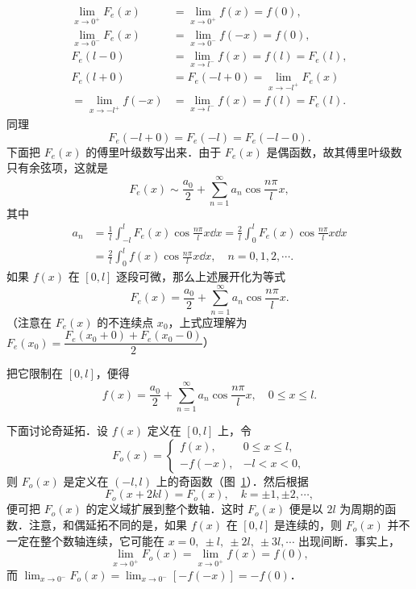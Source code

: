 \[
\begin{aligned}
\lim_{x\to 0^{+}}F_{e}(x)&=\lim_{x\to 0^{+}}f(x)=f(0),\\
\lim_{x\to 0^{-}}F_{e}(x)&=\lim_{x\to 0^{-}}f(-x)=f(0),\\
F_{e}(l-0)&=\lim_{x\to l^{-}}f(x)=f(l)=F_{e}(l),\\
F_{e}(l+0)&=F_{e}(-l+0)=\lim_{x\to -l^{+}}F_{e}(x)\\
=\lim_{x\to -l^{+}}f(-x)&=\lim_{x\to l^{-}}f(x)=f(l)=F_{e}(l).
\end{aligned}
\]
同理
\[
F_{e}(-l+0)=F_{e}(-l)=F_{e}(-l-0).
\]
下面把 $F_{e}(x)$ 的傅里叶级数写出来．由于 $F_{e}(x)$ 是偶函数，故其傅里叶级数只有余弦项，这就是
\[
F_{e}(x)\sim\frac{a_{0}}{2}+\sum_{n=1}^{\infty}a_{n}\cos\frac{n\pi}{l}x,
\]
其中
\[
\begin{aligned}
a_{n}&=\frac{1}{l}\int_{-l}^{l}F_{e}(x)\cos\frac{n\pi}{l}x\dd x=\frac{2}{l}\int_{0}^{l}F_{e}(x)\cos\frac{n\pi}{l}x\dd x\\
&=\frac{2}{l}\int_{0}^{l}f(x)\cos\frac{n\pi}{l}x\dd x,\quad n=0,1,2,\cdots.
\end{aligned}
\]
如果 $f(x)$ 在 $[0,l]$ 逐段可微，那么上述展开化为等式
\[
F_{e}(x)=\frac{a_{0}}{2}+\sum_{n=1}^{\infty}a_{n}\cos\frac{n\pi}{l}x.
\]
（注意在 $F_{e}(x)$ 的不连续点 $x_{0}$，上式应理解为 $F_{e}(x_{0})=\dfrac{F_{e}(x_{0}+0)+F_{e}(x_{0}-0)}{2}$）

把它限制在 $[0,l]$，便得
\[
f(x)=\frac{a_{0}}{2}+\sum_{n=1}^{\infty}a_{n}\cos\frac{n\pi}{l}x,\quad 0\leqslant x\leqslant l.
\]

下面讨论奇延拓．设 $f(x)$ 定义在 $[0,l]$ 上，令
\[
F_{o}(x)=\begin{cases}
f(x), & 0\leqslant x\leqslant l,\\
-f(-x), & -l<x<0,
\end{cases}
\]
则 $F_{o}(x)$ 是定义在 $(-l,l)$ 上的奇函数（图~\ref{fig:14-12}）．然后根据
\[
F_{o}(x+2kl)=F_{o}(x),\quad k=\pm 1,\pm 2,\cdots,
\]
便可把 $F_{o}(x)$ 的定义域扩展到整个数轴．这时 $F_{o}(x)$ 便是以 $2l$ 为周期的函数．注意，和偶延拓不同的是，如果 $f(x)$ 在 $[0,l]$ 是连续的，则 $F_{o}(x)$ 并不一定在整个数轴连续，它可能在 $x=0,\ \pm l,\ \pm 2l,\ \pm 3l,\cdots$ 出现间断．事实上，
\[
\lim_{x\to 0^{+}}F_{o}(x)=\lim_{x\to 0^{+}}f(x)=f(0),
\]
而 $\displaystyle\lim_{x\to 0^{-}}F_{o}(x)=\lim_{x\to 0^{-}}\left[-f(-x)\right]=-f(0)$．

\begin{figure}[htbp]
\centering
{}\caption{\relax}\label{fig:14-12}
\end{figure}

